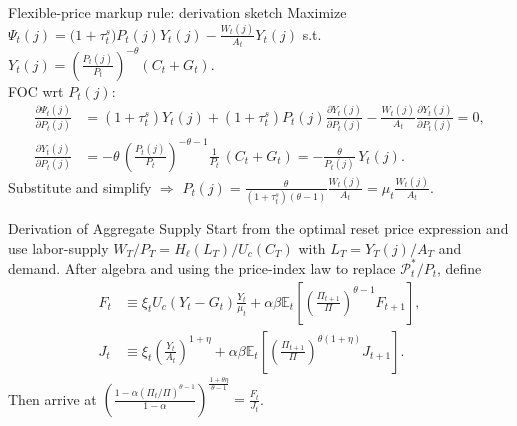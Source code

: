 \documentclass[11pt,aspectratio=169]{beamer}
\newcommand{\E}{\mathbb{E}}
\newcommand{\mc}[1]{\mathcal{#1}}
\begin{document}
\begin{frame}[label=Appendix D.2]{Flexible-price markup rule: derivation sketch}
\small
Maximize $\Psi_t(j) = \big(1+\tau_t^s\big)P_t(j)Y_t(j)-\frac{W_t(j)}{A_t}Y_t(j)$ s.t.\ $Y_t(j)=\left(\frac{P_t(j)}{P_t}\right)^{-\theta}(C_t+G_t)$.
\\[3pt]
FOC wrt $P_t(j)$:
\begin{align*}
\frac{\partial \Psi_t(j)}{\partial P_t(j)} &= \left(1+\tau_t^s\right)Y_t(j) + \left(1+\tau_t^s\right)P_t(j)\frac{\partial Y_t(j)}{\partial P_t(j)} - \frac{W_t(j)}{A_t}\frac{\partial Y_t(j)}{\partial P_t(j)}=0,\\
\frac{\partial Y_t(j)}{\partial P_t(j)} &= -\theta\,\left(\frac{P_t(j)}{P_t}\right)^{-\theta-1}\frac{1}{P_t}\,(C_t+G_t) = -\frac{\theta}{P_t(j)}\,Y_t(j).
\end{align*}
Substitute and simplify $\Rightarrow$ $P_t(j)=\frac{\theta}{(1+\tau_t^s)(\theta-1)}\frac{W_t(j)}{A_t}=\mu_t\frac{W_t(j)}{A_t}$.
\begin{center}
\hyperlink{FlexEquilibrium}{}
\end{center}
\end{frame}
\begin{frame}[label=DerivationAggSupply]{Derivation of Aggregate Supply}
Start from the optimal reset price expression and use labor-supply $W_T/P_T=H_\ell(L_T)/U_c(C_T)$ with $L_T=Y_T(j)/A_T$ and demand.
After algebra and using the price-index law to replace $\mc{P}_t^\ast/P_t$, define
\begin{align*}
F_t &\equiv \xi_t U_c(Y_t-G_t)\frac{Y_t}{\mu_t} + \alpha\beta \E_t\left[\left(\frac{\Pi_{t+1}}{\Pi}\right)^{\theta-1} F_{t+1}\right],\\
J_t &\equiv \xi_t \left(\frac{Y_t}{A_t}\right)^{1+\eta} + \alpha\beta \E_t\left[\left(\frac{\Pi_{t+1}}{\Pi}\right)^{\theta(1+\eta)} J_{t+1}\right].
\end{align*}
Then arrive at $ \left( \frac{1-\alpha (\Pi_t/\Pi)^{\theta-1} }{1-\alpha} \right)^{\frac{1+\theta\eta}{\theta-1}}=\frac{F_t}{J_t}$.
\begin{center}
\hyperlink{NKASFinal}{}
\end{center}
\end{frame}
\end{document}
